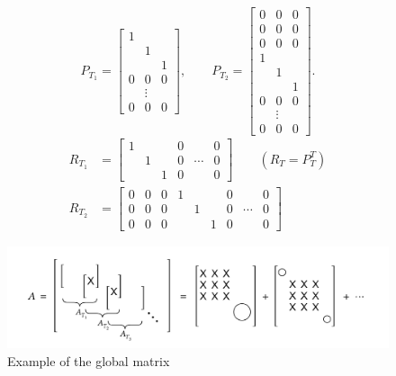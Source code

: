 \begin{example}
\label{thm:examplefiniteelemtents}
\[
P_{T_{1}}= \begin{bmatrix}
	1& & \\
	 &1& \\
	 & &1\\
	0&0&0\\
	 &\vdots& \\
	0&0&0
\end{bmatrix},
\qquad
P_{T_{2}}= \begin{bmatrix}
	0&0&0\\
	0&0&0\\
	0&0&0\\
	1& & \\
	 &1& \\
	 & &1\\
	0&0&0\\
	 &\vdots& \\
	0&0&0
\end{bmatrix}
.\] 
\begin{align*}
	R_{T_1}&=\begin{bmatrix}
	1 & & & 0 &  & 0 \\
	 & 1 & &0 & \cdots & 0 \\
	 &&1 & 0 &  & 0
\end{bmatrix}
\qquad
(R_{T}=P_{T}^{T}) \\
		R_{T_2}&=\begin{bmatrix}
	0 &0 &0 &1 & & & 0 &  & 0 \\
	 0 &0 &0 && 1 & &0 & \cdots & 0 \\
	 0 &0 &0 &&&1 & 0 &  & 0
\end{bmatrix}
\end{align*}
\begin{figure}[ht!]
	\begin{center}
		\includegraphics[width=\textwidth]{pics/chapter0/weird_matrix_equation.png}
	\end{center}
	\caption{Example of the global matrix}
	\label{fig:globalmatrixequation}
\end{figure}
\end{example}

